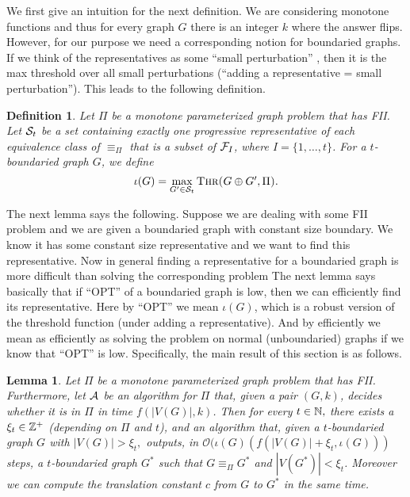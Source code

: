 \documentclass[11pt]{article}
\newtheorem{lemma}{Lemma}
\newtheorem{definition}{Definition}
\newcommand{\cO}{\mathcal{O}}
\begin{document}
We first give an intuition for the next definition.  We are considering monotone functions and thus for every graph $G$ 
there is an integer $k$ where the answer flips. However, for our purpose we need a corresponding notion for 
boundaried graphs.   If we think of the representatives as some ``small perturbation'' , then it is the max threshold over all small perturbations (``adding a representative = small perturbation''). This leads to the following definition. 

\begin{definition}
Let $\Pi$ be a monotone parameterized graph problem that has FII. Let  ${\cal S}_t$  be
a set containing exactly one progressive representative of each equivalence class of $\equiv_{\Pi}$ that is a subset of 
${\cal F}_{I}$, where $I=\{1,\ldots,t\}$.  
For a $t$-boundaried graph $G$, we define   
\[\iota(G)= \max_{G'\in {\cal S}_t}  \mbox{{\sc Thr($G\oplus G',\Pi$)}}. \]
\end{definition}



The next lemma says the following. Suppose we are dealing with some FII problem and we are given a boundaried graph with constant size boundary.  We know it has some constant size representative and we want to find this representative. 
Now in general finding a representative for a boundaried graph is more difficult than solving the corresponding problem
The next lemma says basically that if ``OPT'' of a boundaried graph is low, then we can efficiently find its representative. 
Here by ``OPT''  we mean $\iota(G)$, which is a robust version of the threshold function (under adding a representative). 
And by efficiently we mean as efficiently as solving the problem on normal (unboundaried) graphs if we know that ``OPT'' is low. Specifically, the main result of this section is as follows. 

\begin{lemma}
\label{lem:red2finiteindex}
Let $\Pi$ be a monotone parameterized graph problem that has FII. Furthermore, let $\cal A$ be an 
algorithm for $\Pi$ that, given a pair $(G,k)$, decides whether it is in $\Pi$ in time $f(|V(G)|,k)$. 
Then for every $t\in\Bbb{N},$ there exists a $ \xi_t \in\Bbb{Z}^{+}$ (depending on $\Pi$ and $t$), and 
an algorithm that, given a $t$-boundaried graph $G$  with $|V(G)|>\xi_t,$ outputs, in  $\cO(\iota(G)(f(|V(G)|+\xi_t,\iota(G)))$ steps,
a $t$-boundaried graph $G^*$  such that $G\equiv_{\Pi}G^*$ and  $|V(G^*)| < \xi_t$. Moreover we can compute the translation 
constant  $c$ from $G$ to $G^*$ in the same time.
\end{lemma}
\end{document}
